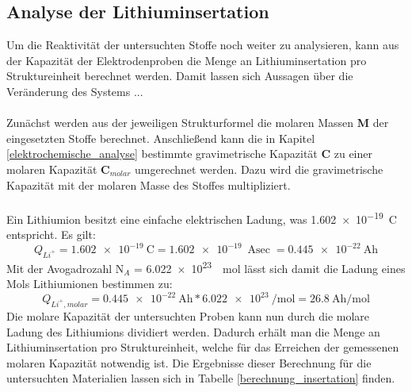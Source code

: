 \documentclass[a4paper, 11pt, headsepline,footsepline,twoside,abstract]{scrbook}
\begin{document}
\subsection{Analyse der Lithiuminsertation}
Um die Reaktivität der untersuchten Stoffe noch weiter zu analysieren, kann aus der Kapazität der Elektrodenproben die Menge an Lithiuminsertation pro Struktureinheit berechnet werden. Damit lassen sich Aussagen über die Veränderung des Systems ...
\\\\
Zunächst werden aus der jeweiligen Strukturformel die molaren Massen \textbf{M} der eingesetzten Stoffe berechnet. Anschließend kann die in Kapitel \ref{elektrochemische_analyse} bestimmte gravimetrische Kapazität \textbf{C} zu einer molaren Kapazität \textbf{C$_{molar}$} umgerechnet werden. Dazu wird die gravimetrische Kapazität mit der molaren Masse des Stoffes multipliziert.
\\\\ 
Ein Lithiumion besitzt eine einfache elektrischen Ladung, was \SI{1.602e-19}{\coulomb} entspricht. Es gilt:
\begin{equation}
	Q_{Li^+} = \SI{1.602e-19}{\coulomb} = \SI{1.602e-19}{\ampere\sec} = \SI{0,445e-22}{\ampere\hour}
\end{equation}
Mit der Avogadrozahl N$_A$ = \SI{6,022e23}{\per\mol} lässt sich damit die Ladung eines Mols Lithiumionen bestimmen zu:
\begin{equation}
	Q_{Li^+, molar} = \SI{0,445e-22}{\ampere\hour} * \SI{6,022e23}{\per\mol} = \SI{26,8}{\ampere\hour\per\mol}
\end{equation}
Die molare Kapazität der untersuchten Proben kann nun durch die molare Ladung des Lithiumions dividiert werden. Dadurch erhält man die Menge an Lithiuminsertation pro Struktureinheit, welche für das Erreichen der gemessenen molaren Kapazität notwendig ist. Die Ergebnisse dieser Berechnung für die untersuchten Materialien lassen sich in Tabelle \ref{berechnung_insertation} finden.
\\
\end{document}
